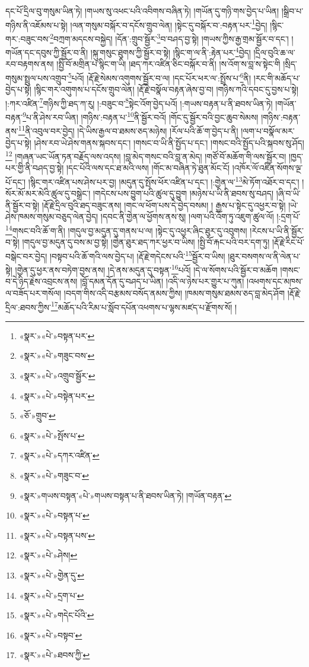 དང་པོ་དྲིལ་བུ་གསུམ་ཡིན་ཏེ། །གཡས་སུ་འཕང་པའི་འབིགས་བཞིན་ཏེ། །གཡོན་དུ་གཉི་གས་བྱེད་པ་ཡིན། །སྒྲིབ་པ་གཉིས་ནི་འཇོམས་པ་སྟེ། །ལན་གསུམ་བསྐོར་བ་དངོས་གྲུབ་ལེན། །སྟེང་དུ་བསྐོར་བ་:བརྟན་པར་\footnote{«སྣར་»«པེ་»བསྟན་པར་}བྱེད། །སྙིང་གར་:བཟུང་བས་\footnote{«སྣར་»«པེ་»གཟུང་བས་}བཀྲག་མདངས་བསྐྱེད། །དོན་:གྲུབ་སྦྱོར་\footnote{«སྣར་»«པེ་»འགྲུབ་སྦྱོར་}བ་བཤད་བྱ་སྟེ། །གཡས་ཀྱིས་རྒྱ་གྲམ་སྦྱོར་བ་དང་། །གཡོན་དང་དབུས་ཀྱི་སྦྱོར་བ་ནི། །སྐུ་གསུང་ཐུགས་ཀྱི་སྦྱོར་བ་སྟེ། །སྙིང་ག་ལ་ནི་:རྟེན་པར་\footnote{«སྣར་»«པེ་»བསྟེན་པར་}བྱེད། །དྲིལ་བུའི་ཆ་ལ་རབ་བརྟགས་ནས། །སྤྱི་བོ་མགྲིན་པ་སྙིང་ག་ཡི། །ཐད་ཀར་འཛིན་ཅིང་བསྐོར་བ་ནི། །ས་འོག་ས་བླ་ས་སྟེང་གི །སྲིད་གསུམ་སྤྲུལ་པས་འགྲུབ་\footnote{«ཅོ་»གྲུབ་}པའོ། །རྡོ་རྗེ་སེམས་འགུགས་སྦྱོར་བ་ལ། །དང་པོར་ཕར་ལ་:སྤྲོས་པ་\footnote{«སྣར་»«པེ་»སྤོས་པ་}ནི། །རང་གི་མཆོད་པ་བྱེད་པ་སྟེ། །སྙིང་གར་འགུགས་པ་དངོས་གྲུབ་ལེན། །རྡོ་རྗེ་བསྣོལ་བརྟན་ཞེས་བྱ་བ། །གཉིས་ཀའི་དབང་དུ་བྱས་པ་སྟེ། །:ཀར་འཛིན་\footnote{«སྣར་»«པེ་»དཀར་འཛིན་}གཉིས་ཀྱི་ཐད་ཀ་རུ། །:བཟུང་བ་\footnote{«སྣར་»«པེ་»གཟུང་བ་}སྟེང་འོག་བྱེད་པའོ། །:གཡས་བརྟན་པ་ནི་ཐབས་ཡིན་ཏེ། །གཡོན་བརྟན་\footnote{«སྣར་»གཡས་བསྟན་«པེ་»གཡས་བསྟན་པ་ནི་ཐབས་ཡིན་ཏེ། །གཡོན་བརྟན་}པ་ནི་ཤེས་རབ་ཡིན། །གཉིས་:བརྟན་པ་\footnote{«སྣར་»«པེ་»བསྟན་པ་}ནི་སྦྱོར་བའོ། །གོང་དུ་སྦྱོར་བའི་བྱང་ཆུབ་སེམས། །གཉིས་:བརྟན་ནས་\footnote{«སྣར་»«པེ་»བསྟན་པས་}ནི་འབུལ་བར་བྱེད། །དེ་ཡིས་རྒྱལ་བ་ཐམས་ཅད་མཉེས། །རོལ་པའི་ཆོ་ག་བྱེད་པ་ནི། །ལག་པ་བསྣོལ་མར་བྱེད་པ་སྟེ། །ཤེས་རབ་ཡེ་ཤེས་གནས་སྐབས་དང་། །གསང་བ་ཡི་ནི་སྤྱོད་པ་དང་། །གསང་བའི་སྤྱོད་པའི་སྐབས་སུ་ཤོད།\footnote{«སྣར་»«པེ་»ཤེས།} །གཞན་ཡང་ཡོན་ཏན་བརྗོད་ལས་འདས། །བླ་མེད་གསང་བའི་བླ་ན་མེད། །གཙོ་བོ་མཆོག་གི་ལས་སྦྱོར་བ། །ཁྱད་པར་གྱི་ནི་བཤད་བྱ་སྟེ། །དང་པོའི་ལས་དང་ཐ་མའི་ལས། །གོང་མ་བཞིན་ཏེ་ཐུན་མོང་ངོ། །འཁོར་ལོ་འཛིན་སོགས་ལྔ་པོ་དང་། །སྙིང་གར་འཛིན་པས་ཤེས་པར་བྱ། །མདུན་དུ་སྤོས་ཕོར་འཛིན་པ་དང་། །:གྱེན་ལ་\footnote{«སྣར་»«པེ་»གྱེན་དུ་}མེ་ཏོག་འཐོར་བ་དང་། །སོར་མོ་མར་མེའི་ཚུལ་དུ་བསྒྲེང་། །གདེངས་པས་བྱུག་པའི་ཚུལ་དུ་བྱུག །མཉེས་པ་ཡི་ནི་ཐབས་སུ་བཤད། །ཞི་བ་ཡི་ནི་སྦྱོར་བ་སྟེ། །རྡོ་རྗེ་དྲིལ་བུའི་ཐད་བཟུང་ནས། །གང་ལ་ཕོག་པས་དེ་བྱེད་བསམ། །
རྒྱས་པ་སྟེང་དུ་འཕྱར་བ་སྟེ། །ཡེ་ཤེས་ཁམས་གསུམ་བཅུད་ལེན་བྱེད། །དབང་ནི་གྱེན་ལ་ཕྱོགས་ནས་སུ། །ལག་པའི་འོག་ཏུ་འཇུག་ཚུལ་ལོ། །:དྲག་པོ་\footnote{«སྣར་»«པེ་»དྲག་པ་}གསང་བའི་ཆོ་ག་ནི། །གདུལ་བྱ་མདུན་དུ་གནས་པ་ལ། །སྟེང་དུ་འཕྱར་ཞིང་ཐུར་དུ་འབུགས། །རེངས་པ་ཡི་ནི་སྦྱོར་བ་སྟེ། །གདུལ་བྱ་མདུན་དུ་བས་མ་བྱ་སྟེ། །གྱེན་ཐུར་ཐད་ཀར་ཕྱར་བ་ཡིས། །སྤྱི་བོ་རྐང་པའི་བར་དག་ཏུ། །རྡོ་རྗེ་རིང་པོ་བསྒེང་བར་བྱེད། །བསྟབ་པའི་ཆོ་གའི་ལས་བྱེད་པ། །རྡོ་རྗེ་གདེངས་པའི་\footnote{«སྣར་»«པེ་»གདེང་པོའི་}སྦྱོར་བ་ཡིས། །ཐུར་བསགས་ལ་ནི་ལེན་པ་སྟེ། །གྱེན་དུ་ཕྱར་ནས་བཏེག་བྱས་ནས། །དེ་ནས་མདུན་དུ་བསྟན་\footnote{«སྣར་»«པེ་»བསྟབ་}པའོ། །དེ་ལ་སོགས་པའི་སྦྱོར་བ་མཆོག །གསང་བ་དེ་ཉིད་རྗེས་འབྲངས་ནས། །བློ་དམན་དོན་དུ་བཤད་པ་ཡིན། །འདི་ལ་ཉེས་པར་གྱུར་པ་ཀུན། །འཕགས་དང་མཁས་ལ་བཟོད་པར་གསོལ། །བདག་གིས་འདི་བརྩམས་བསོད་ནམས་ཀྱིས། །ཁམས་གསུམ་ཐམས་ཅད་བླ་མེད་ཤོག །རྡོ་རྗེ་དྲིལ་:ཐབས་ཀྱིས་\footnote{«སྣར་»«པེ་»ཐབས་ཀྱི་}མཆོད་པའི་རིམ་པ་སློབ་དཔོན་འཕགས་པ་ལྷས་མཛད་པ་རྫོགས་སོ། ། 